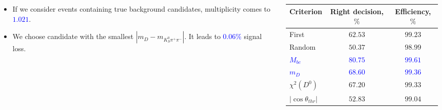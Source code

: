 \documentclass[10 pt,compress,mathserif]{beamer}
\begin{document}
\begin{frame}
\begin{small}
 \begin{columns}
  \begin{column}{0.4\textwidth}
   \begin{itemize}
    \item If we consider events containing true background candidates, multiplicity comes to \textcolor{blue}{$1.021$}.
    \item We choose candidate with the smallest $|m_{D}-m_{K_S^0\pi^+\pi^-}|$. It leads to \textcolor{blue}{$0.06\%$} signal loss.
   \end{itemize}

  \end{column}
  \begin{column}{0.6\textwidth}
   \begin{table}[bt]
   \small
   \begin{tabular}{|l|c|c|} \hline
   {Criterion} & {Right decision}, $\%$ & {Efficiency}, $\%$ \\ \hline
   First              & $62.53$ & $99.23$ \\ \hline
   Random             & $50.37$ & $98.99$ \\ \hline
   \textcolor{blue}{$M_{bc}$} & \textcolor{blue}{$80.75$} & \textcolor{blue}{$99.61$} \\ \hline
   \textcolor{blue}{$m_D$}    & \textcolor{blue}{$68.60$} & \textcolor{blue}{$99.36$} \\ \hline
   $\chi^2(D^0)$      & $67.20$ & $99.33$ \\ \hline
   $\left|\cos\theta_{thr}\right|$ & $52.83$ & $99.04$ \\ \hline
   \end{tabular}
   \end{table}
  \end{column}
 \end{columns}
\end{small}
\end{frame}
\end{document}
